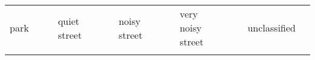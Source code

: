 %
\vspace{0.5cm}

\begin{tabular}{|p{1cm}|l|p{0.001cm}|p{2cm}|l|p{0.001cm}|p{2cm}|l|p{0.001cm}|p{2.75cm}|l|p{0.001cm}|p{2cm}|l|}

\hhline{|-|-|~|-|-|~|-|-|~|-|-|~|-|-|}
park & {\cellcolor[HTML]{5AB25A}} & & quiet street & {\cellcolor[HTML]{FFCB2F}} & & noisy street & {\cellcolor[HTML]{F56B00}} & &  very noisy street & {\cellcolor[HTML]{9A0000}} & & unclassified & \\
\hhline{|-|-|~|-|-|~|-|-|~|-|-|~|-|-|}

\end{tabular}